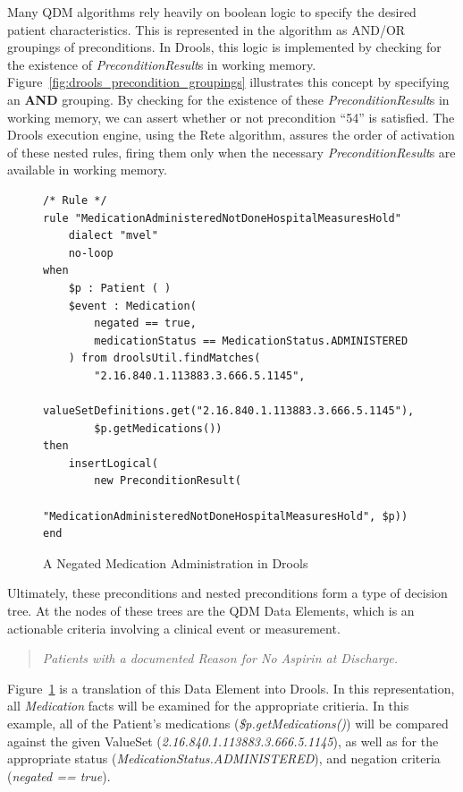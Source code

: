 \documentclass{amia}
\begin{document}
Many QDM algorithms rely heavily on boolean logic to specify the desired patient characteristics. This is represented in the algorithm as AND/OR groupings of preconditions. In Drools, this logic is implemented by checking for the existence of \textit{PreconditionResult}s in working memory. Figure~\ref{fig:drools_precondition_groupings} illustrates this concept by specifying an \textbf{AND} grouping. By checking for the existence of these \textit{PreconditionResult}s in working memory, we can assert whether or not precondition ``54'' is satisfied. The Drools execution engine, using the Rete algorithm, assures the order of activation of these nested rules, firing them only when the necessary \textit{PreconditionResult}s are available in working memory\cite{forgy1982rete}.


\begin{figure}[H]
\begin{verbatim}
/* Rule */
rule "MedicationAdministeredNotDoneHospitalMeasuresHold"
    dialect "mvel"
    no-loop
when
    $p : Patient ( )
    $event : Medication(
        negated == true,
        medicationStatus == MedicationStatus.ADMINISTERED
    ) from droolsUtil.findMatches(
        "2.16.840.1.113883.3.666.5.1145", 
        valueSetDefinitions.get("2.16.840.1.113883.3.666.5.1145"), 
        $p.getMedications())
then
    insertLogical(
        new PreconditionResult(
            "MedicationAdministeredNotDoneHospitalMeasuresHold", $p))
end
\end{verbatim}
\caption{A Negated Medication Administration in Drools} 
\label{fig:drools_data_element}
\end{figure}

Ultimately, these preconditions and nested preconditions form a type of decision tree. At the nodes of these trees are the QDM Data Elements\cite{http://www.healthit.gov/sites/default/files/qdm_122012.pdf}, which is an actionable criteria involving a clinical event or measurement.

\begin{quote}
\textit{Patients with a documented Reason for No Aspirin at Discharge.}
\end{quote}

Figure~\ref{fig:drools_data_element} is a translation of this Data Element into Drools. In this representation, all \textit{Medication} facts will be examined for the appropriate critieria. In this example, all of the Patient's medications (\textit{\$p.getMedications()}) will be compared against the given ValueSet (\textit{2.16.840.1.113883.3.666.5.1145}), as well as for the appropriate status (\textit{MedicationStatus.ADMINISTERED}), and negation criteria (\textit{negated == true}).
\end{document}
